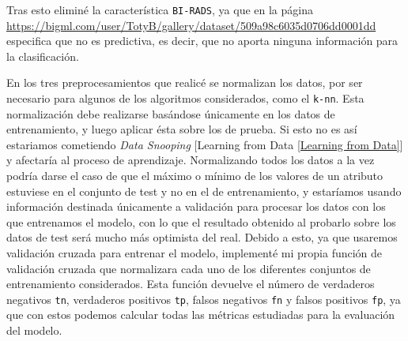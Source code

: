 \documentclass[a4]{article}
\begin{document}
  Tras esto eliminé la característica \texttt{BI-RADS}, ya que en la página \\\href{https://bigml.com/user/TotyB/gallery/dataset/509a98c6035d0706dd0001dd}{https://bigml.com/user/TotyB/gallery/dataset/509a98c6035d0706dd0001dd} especifica que no es predictiva, es decir, que no aporta ninguna información para la clasificación.

 En los tres preprocesamientos que realicé se normalizan los datos, por ser necesario para algunos de los algoritmos considerados, como el \texttt{k-nn}. Esta normalización debe realizarse basándose únicamente en los datos de entrenamiento, y luego aplicar ésta sobre los de prueba. Si esto no es así estariamos cometiendo \textit{Data Snooping} [Learning from Data \ref{Learning from Data}] y afectaría al proceso de aprendizaje. Normalizando todos los datos a la vez podría darse el caso de que el máximo o mínimo de los valores de un atributo estuviese en el conjunto de test y no en el de entrenamiento, y estaríamos usando información destinada únicamente a validación para procesar los datos con los que entrenamos el modelo, con lo que el resultado obtenido al probarlo sobre los datos de test será mucho más optimista del real. Debido a esto, ya que usaremos validación cruzada para entrenar el modelo, implementé mi propia función de validación cruzada que normalizara cada uno de los diferentes conjuntos de entrenamiento considerados. Esta función devuelve el número de verdaderos negativos \texttt{tn}, verdaderos positivos \texttt{tp}, falsos negativos \texttt{fn} y falsos positivos \texttt{fp}, ya que con estos podemos calcular todas las métricas estudiadas para la evaluación del modelo.
\newpage
\end{document}
